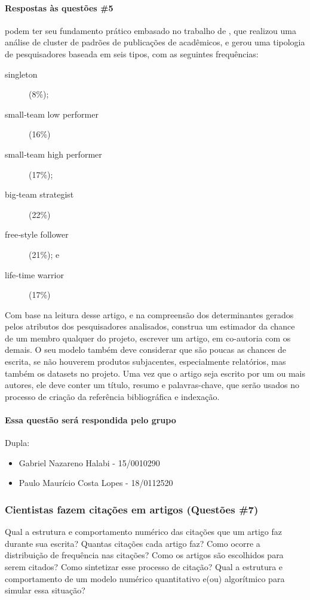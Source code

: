 \paragraph{Respostas às questões \#5} podem ter seu fundamento prático embasado no trabalho de \cite{gu_developing_2019}, que realizou uma análise de cluster de padrões de publicações de acadêmicos, e gerou uma tipologia de pesquisadores baseada em seis tipos, com as seguintes frequências:
\begin{description}
    \item [singleton] (8\%); 
    \item [small‐team low performer] (16\%)
    \item [small‐team high performer] (17\%);
    \item [big‐team strategist] (22\%)
    \item [free‐style follower] (21\%); e
    \item [life‐time warrior] (17\%)
\end{description}
Com base na leitura desse artigo, e na compreensão dos determinantes gerados pelos atributos dos pesquisadores analisados, construa um estimador da chance de um membro qualquer do projeto, escrever um artigo, em co-autoria com os demais. O seu modelo também deve considerar que são poucas as chances de escrita, se não houverem produtos subjacentes, especialmente relatórios, mas também os datasets no projeto.
Uma vez que o artigo seja escrito por um ou mais autores, ele deve conter um título, resumo e palavras-chave, que serão usados no processo de criação da referência bibliográfica e indexação.

\paragraph{Essa questão será respondida pelo grupo} 
Dupla:
\begin{itemize}
    \item Gabriel Nazareno Halabi - 15/0010290
    \item Paulo Maurício Costa Lopes - 18/0112520
\end{itemize}

\subsubsection{Cientistas fazem citações em artigos (Questões \#7)} Qual a estrutura e comportamento numérico das citações que um artigo faz durante sua escrita? Quantas citações cada artigo faz? Como ocorre a distribuição de frequência nas citações? Como os artigos são escolhidos para serem citados? Como sintetizar esse processo de citação? Qual a estrutura e comportamento de um modelo numérico quantitativo e(ou) algorítmico para simular essa situação?

